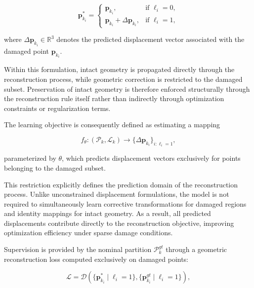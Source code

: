 \begin{equation}
\mathbf{p}_{k_i}^{*} =
\begin{cases}
\mathbf{p}_{k_i},
& \text{if } \ell_i = 0,
\\[4pt]
\mathbf{p}_{k_i} + \Delta \mathbf{p}_{k_i},
& \text{if } \ell_i = 1,
\end{cases}
\label{eq:reconstruction_rule}
\end{equation}

\noindent where $\Delta \mathbf{p}_{k_i} \in \mathbb{R}^{3}$ denotes the predicted displacement vector associated with the damaged point $\mathbf{p}_{k_i}$.

Within this formulation, intact geometry is propagated directly through the reconstruction process, while geometric correction is restricted to the damaged subset. Preservation of intact geometry is therefore enforced structurally through the reconstruction rule itself rather than indirectly through optimization constraints or regularization terms.

The learning objective is consequently defined as estimating a mapping

\begin{equation}
f_{\theta} :
(\mathcal{P}_k,\mathcal{L}_k)
\rightarrow
\{\Delta \mathbf{p}_{k_i}\}_{i:\ell_i = 1},
\label{eq:mapping}
\end{equation}

\noindent parameterized by $\theta$, which predicts displacement vectors exclusively for points belonging to the damaged subset.


This restriction explicitly defines the prediction domain of the reconstruction process. Unlike unconstrained displacement formulations, the model is not required to simultaneously learn corrective transformations for damaged regions and identity mappings for intact geometry. As a result, all predicted displacements contribute directly to the reconstruction objective, improving optimization efficiency under sparse damage conditions.

Supervision is provided by the nominal partition $\mathcal{P}_{k}^{gt}$ through a geometric reconstruction loss computed exclusively on damaged points:

\begin{equation}
\mathcal{L} =
\mathcal{D}
\left(
\{\mathbf{p}_{k_i}^{*} \mid \ell_i = 1\},
\{\mathbf{p}_{k_i}^{gt} \mid \ell_i = 1\}
\right),
\label{eq:loss}
\end{equation}

